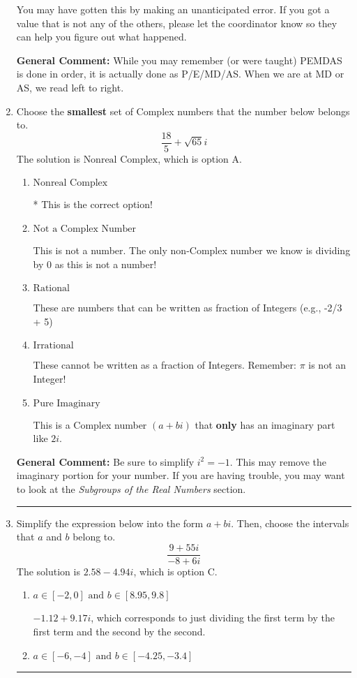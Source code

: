 \documentclass{extbook}[14pt]
\newcommand{\litem}[1]{\item #1

\rule{\textwidth}{0.4pt}}
\begin{document}
\begin{enumerate}
{\begin{enumerate}[label=\Alph*.]
 You may have gotten this by making an unanticipated error. If you got a value that is not any of the others, please let the coordinator know so they can help you figure out what happened.
\end{enumerate}

\textbf{General Comment:} While you may remember (or were taught) PEMDAS is done in order, it is actually done as P/E/MD/AS. When we are at MD or AS, we read left to right.
}
\litem{
Choose the \textbf{smallest} set of Complex numbers that the number below belongs to.
\[ \frac{18}{5}+\sqrt{65} i \]The solution is \( \text{Nonreal Complex} \), which is option A.\begin{enumerate}[label=\Alph*.]
\item \( \text{Nonreal Complex} \)

* This is the correct option!
\item \( \text{Not a Complex Number} \)

This is not a number. The only non-Complex number we know is dividing by 0 as this is not a number!
\item \( \text{Rational} \)

These are numbers that can be written as fraction of Integers (e.g., -2/3 + 5)
\item \( \text{Irrational} \)

These cannot be written as a fraction of Integers. Remember: $\pi$ is not an Integer!
\item \( \text{Pure Imaginary} \)

This is a Complex number $(a+bi)$ that \textbf{only} has an imaginary part like $2i$.
\end{enumerate}

\textbf{General Comment:} Be sure to simplify $i^2 = -1$. This may remove the imaginary portion for your number. If you are having trouble, you may want to look at the \textit{Subgroups of the Real Numbers} section.
}
\litem{
Simplify the expression below into the form $a+bi$. Then, choose the intervals that $a$ and $b$ belong to.
\[ \frac{9 + 55 i}{-8 + 6 i} \]The solution is \( 2.58  - 4.94 i \), which is option C.\begin{enumerate}[label=\Alph*.]
\item \( a \in [-2, 0] \text{ and } b \in [8.95, 9.8] \)

 $-1.12  + 9.17 i$, which corresponds to just dividing the first term by the first term and the second by the second.
\item \( a \in [-6, -4] \text{ and } b \in [-4.25, -3.4] \)


\end{enumerate}}
\end{enumerate}
\end{document}

